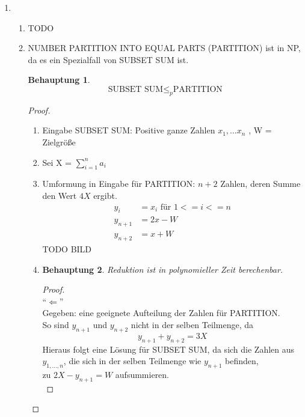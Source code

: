 \documentclass[a4paper]{scrartcl}
\newtheorem*{proposition}{Behauptung}
\begin{document}
\begin{enumerate}[label=\bfseries \arabic*.]
\item %
\begin{enumerate}
    \item %
        TODO
    \item %
     NUMBER PARTITION INTO EQUAL PARTS (PARTITION) ist in NP, da es ein Spezialfall von SUBSET SUM ist.
    \begin{proposition}
        \[ \text{SUBSET SUM} \leq_{p} \text{PARTITION} \]
    \end{proposition}
    \begin{proof}
        \hfill \\
        \begin{enumerate}
            \item Eingabe SUBSET SUM: Positive ganze Zahlen $x_1, \dotsc x_n$ , W = Zielgröße
            \item Sei X = $\sum_{i=1}^{n} a_i $
            \item Umformung in Eingabe für PARTITION: $n + 2$ Zahlen, deren Summe den Wert $4X$ ergibt.\\ 
            \begin{align*}
                y_i &= x_i \text{ für } 1 <= i <= n \\
                y_{n+1} &= 2x - W \\
                y_{n+2} &= x + W
            \end{align*}
            TODO BILD %

            \item
                \begin{proposition}
                Reduktion ist in polynomieller Zeit berechenbar.
                \end{proposition}
                \begin{proof}
                    \hfill \\
                    ``$\Leftarrow$'' \\
                    Gegeben: eine geeignete Aufteilung der Zahlen für PARTITION.\\
                    So sind $y_{n+1}$ und $y_{n+2}$ nicht in der selben Teilmenge, da
                    $$y_{n+1} + y_{n+2} = 3X$$
                    Hieraus folgt eine Lösung für SUBSET SUM, da sich die Zahlen aus $y_{1,\dotsc,n}$,
                    die sich in der selben Teilmenge wie $y_{n+1}$ befinden, \\
                    zu $2X - y_{n+1} = W$ aufsummieren. \\


\end{proof}
\end{enumerate}
\end{proof}
\end{enumerate}
\end{enumerate}
\end{document}

